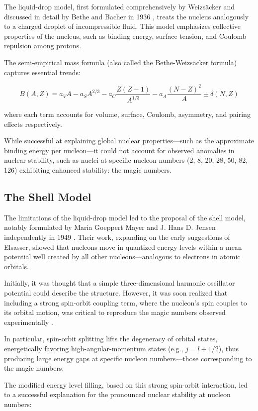 The liquid-drop model, first formulated comprehensively by Weizsäcker and discussed in detail by Bethe and Bacher in 1936 \cite{bethe_nuclear_1936}, treats the nucleus analogously to a charged droplet of incompressible fluid. This model emphasizes collective properties of the nucleus, such as binding energy, surface tension, and Coulomb repulsion among protons.

The semi-empirical mass formula (also called the Bethe-Weizsäcker formula) captures essential trends:

\[B(A,Z) = a_VA - a_SA^{2/3} - a_C\frac{Z(Z-1)}{A^{1/3}} - a_A\frac{(N-Z)^2}{A}\pm \delta(N,Z)\]

where each term accounts for volume, surface, Coulomb, asymmetry, and pairing effects respectively.

While successful at explaining global nuclear properties—such as the approximate binding energy per nucleon—it could not account for observed anomalies in nuclear stability, such as nuclei at specific nucleon numbers (2, 8, 20, 28, 50, 82, 126) exhibiting enhanced stability: the magic numbers.

\subsection{The Shell Model}

The limitations of the liquid-drop model led to the proposal of the shell model, notably formulated by Maria Goeppert Mayer and J. Hans D. Jensen independently in 1949 \cite{mayer_shell_1968}. Their work, expanding on the early suggestions of Elsasser, showed that nucleons move in quantized energy levels within a mean potential well created by all other nucleons—analogous to electrons in atomic orbitals.

Initially, it was thought that a simple three-dimensional harmonic oscillator potential could describe the structure. However, it was soon realized that including a strong spin-orbit coupling term, where the nucleon's spin couples to its orbital motion, was critical to reproduce the magic numbers observed experimentally \cite{haxel_magic_nodate,mayer_shell_1968}.

In particular, spin-orbit splitting lifts the degeneracy of orbital states, energetically favoring high-angular-momentum states (e.g., $j=l+1/2$), thus producing large energy gaps at specific nucleon numbers—those corresponding to the magic numbers.

The modified energy level filling, based on this strong spin-orbit interaction, led to a successful explanation for the pronounced nuclear stability at nucleon numbers:

